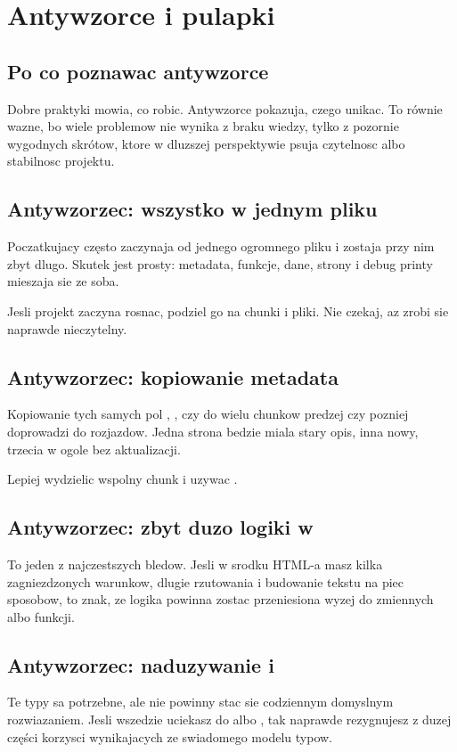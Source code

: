 \chapter{Antywzorce i pulapki}

\section{Po co poznawac antywzorce}
Dobre praktyki mowia, co robic. Antywzorce pokazuja, czego unikac. To równie wazne,
bo wiele problemow nie wynika z braku wiedzy, tylko z pozornie wygodnych skrótow,
ktore w dluzszej perspektywie psuja czytelnosc albo stabilnosc projektu.

\section{Antywzorzec: wszystko w jednym pliku}
Poczatkujacy często zaczynaja od jednego ogromnego pliku i zostaja przy nim zbyt dlugo.
Skutek jest prosty: metadata, funkcje, dane, strony i debug printy mieszaja sie ze soba.

Jesli projekt zaczyna rosnac, podziel go na chunki i pliki. Nie czekaj, az zrobi sie
naprawde nieczytelny.

\section{Antywzorzec: kopiowanie metadata}
Kopiowanie tych samych pol , ,  czy 
do wielu chunkow predzej czy pozniej doprowadzi do rozjazdow. Jedna strona bedzie miala
stary opis, inna nowy, trzecia w ogole bez aktualizacji.

Lepiej wydzielic wspolny chunk  i uzywac .

\section{Antywzorzec: zbyt duzo logiki w }
To jeden z najczestszych bledow. Jesli w srodku HTML-a masz kilka zagniezdzonych warunkow,
dlugie rzutowania i budowanie tekstu na piec sposobow, to znak, ze logika powinna zostac
przeniesiona wyzej do zmiennych albo funkcji.

\section{Antywzorzec: naduzywanie  i }
Te typy sa potrzebne, ale nie powinny stac sie codziennym domyslnym rozwiazaniem.
Jesli wszedzie uciekasz do  albo , tak naprawde rezygnujesz z duzej
części korzysci wynikajacych ze swiadomego modelu typow.

